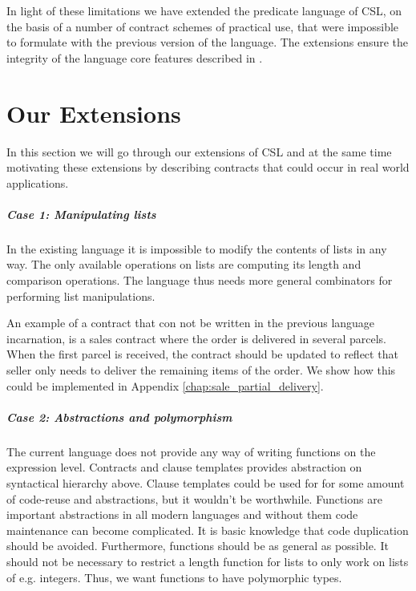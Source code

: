 \documentclass[10pt,a4paper,final,oneside,openany,article]{memoir}
\begin{document}
In light of these limitations we have extended the predicate language
of CSL, on the basis of a number of contract schemes of practical use,
that were impossible to formulate with the previous version of the
language. The extensions ensure the integrity of the language core
features described in \cite{hvitved10}.


\chapter{Our Extensions}

\label{extensions} In this section we will go through our extensions
of CSL and at the same time motivating these extensions by describing
contracts that could occur in real world applications.

\paragraph{Case 1: Manipulating lists} In the existing language it is
impossible to modify the contents of lists in any way. The only
available operations on lists are computing its length and comparison
operations. The language thus needs more general combinators for
performing list manipulations.

An example of a contract that con not be written in the previous
language incarnation, is a sales contract where the order is delivered
in several parcels. When the first parcel is received, the contract
should be updated to reflect that seller only needs to deliver the
remaining items of the order.  We show how this could be implemented
in Appendix \ref{chap:sale_partial_delivery}.

\paragraph{Case 2: Abstractions and polymorphism} The current language
does not provide any way of writing functions on the expression
level. Contracts and clause templates provides abstraction on
syntactical hierarchy above. Clause templates could be used for for
some amount of code-reuse and abstractions, but it wouldn't be
worthwhile. Functions are important abstractions in all modern
languages and without them code maintenance can become complicated. It
is basic knowledge that code duplication should be avoided.
Furthermore, functions should be as general as possible. It should not
be necessary to restrict a length function for lists to only work on
lists of e.g. integers. Thus, we want functions to have polymorphic
types.
\end{document}
